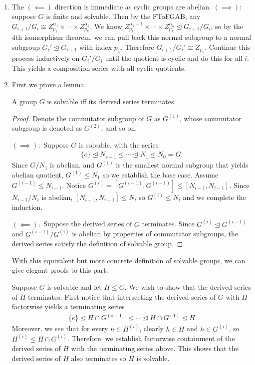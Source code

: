 \documentclass[12pt]{article}
\begin{document}
\begin{problem}[2]
~\begin{enumerate}[label=(\alph*)]
	\item The $ (\impliedby)$ direction is immediate as cyclic groups are abelian. $ (\implies):$ suppose $ G$ is finite and solvable. Then by the FToFGAB, any $ G_{i+1} / G_i \cong Z_{p_1}^{ \alpha_1} \times \cdots \times Z_{p_k}^{ \alpha_k}$. We know $ Z_{p_1}^{ \alpha_1-1} \times \cdots \times Z_{p_k}^{ \alpha_k} \trianglelefteq G_{i+1} / G_i$, so by the 4th isomorphism theorem, we can pull back this normal subgroup to a normal subgroup $ G_i' \trianglelefteq G_{i+1}$ with index $ p_1$. Therefore $ G_{i+1} / G_i' \cong Z_{p_1}$. Continue this process inductively on $ G_i' / G_i$ until the quotient is cyclic and do this for all $ i$. This yields a composition series with all cyclic quotients.
	\item First we prove a lemma.
\begin{lem}
A group $ G$ is solvable iff its derived series terminates.
\end{lem}
\begin{proof}
Denote the commutator subgroup of $ G$ as  $ G^{(1)}$, whose commutator subgroup is denoted as $ G^{(2)}$, and so on.

$ (\implies):$ Suppose $ G$ is solvable, with the series
 \begin{align*}
	\{e\} \trianglelefteq N_{s-1} \trianglelefteq \cdots \trianglelefteq N_1 \trianglelefteq N_0 = G.
\end{align*}
Since $ G / N_1$ is abelian, and $ G^{(1)}$ is the smallest normal subgroup that yields abelian quotient, $ G^{(1)} \leq N_1$ so we establish the base case. Assume $ G^{(i-1)} \leq N_{i-1}$. Notice $ G^{(i)} = [G^{(i-1)},G^{(i-1)}] \leq [N_{i-1},N_{i-1}]$. Since $ N_{i-1} / N_i$ is abelian, $[N_{i-1},N_{i-1}] \leq N_i$ so $ G^{(i)} \leq N_i$ and we complete the induction.

$ (\impliedby):$ Suppose the derived series of $ G$ terminates. Since $ G^{(i)} \trianglelefteq G^{(i-1)}$ and $ G^{(i-1)} / G^{(i)}$ is abelian by properties of commutator subgroups, the derived series satisfy the definition of solvable group.
\end{proof}

With this equivalent but more concrete definition of solvable groups, we can give elegant proofs to this part.

Suppose $ G$ is solvable and let $ H \leq G$. We wish to show that the derived series of $ H$ terminates. First notice that intersecting the derived series of $ G$ with $ H$ factorwise yields a terminating series
\begin{align*}
	\{e\} \trianglelefteq H \cap G^{(s-1)} \trianglelefteq \cdots \trianglelefteq H \cap  G^{(1)} \trianglelefteq H 
\end{align*}
Moreover, we see that for every $ h \in H^{(i)}$, clearly $ h \in H$ and $ h \in G^{(i)}$, so $ H^{(i)} \leq H \cap G^{(i)}$. Therefore, we establish factorwise containment of the derived series of $ H$ with the terminating series above. This shows that the derived series of  $ H$ also terminates so  $ H$ is solvable.


\end{enumerate}
\end{problem}
\end{document}
